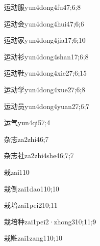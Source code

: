 \begin{verbete}{运动服}{yun4dong4fu4}{7;6;8}
\end{verbete}
\begin{verbete}{运动会}{yun4dong4hui4}{7;6;6}
\end{verbete}
\begin{verbete}{运动家}{yun4dong4jia1}{7;6;10}
\end{verbete}
\begin{verbete}{运动衫}{yun4dong4shan1}{7;6;8}
\end{verbete}
\begin{verbete}{运动鞋}{yun4dong4xie2}{7;6;15}
\end{verbete}
\begin{verbete}{运动学}{yun4dong4xue2}{7;6;8}
\end{verbete}
\begin{verbete}{运动员}{yun4dong4yuan2}{7;6;7}
\end{verbete}
\begin{verbete}{运气}{yun4qi5}{7;4}
\end{verbete}
\begin{verbete}{杂志}{za2zhi4}{6;7}
\end{verbete}
\begin{verbete}{杂志社}{za2zhi4she4}{6;7;7}
\end{verbete}
\begin{verbete}{栽}{zai1}{10}
\end{verbete}
\begin{verbete}{栽倒}{zai1dao1}{10;10}
\end{verbete}
\begin{verbete}{栽培}{zai1pei2}{10;11}
\end{verbete}
\begin{verbete}{栽培种}{zai1pei2·zhong3}{10;11;9}
\end{verbete}
\begin{verbete}{栽赃}{zai1zang1}{10;10}
\end{verbete}
